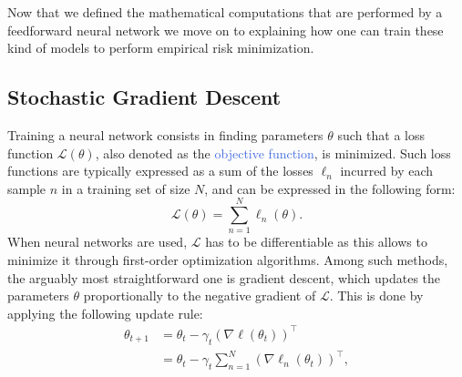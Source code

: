 Now that we defined the mathematical computations that are performed by a feedforward neural network we move on to explaining how one can train these kind of models to perform empirical risk minimization.

\subsection{Stochastic Gradient Descent}
\label{sec:sgd}

Training a neural network consists in finding parameters $\theta$ such that a loss function $\mathscr{L}(\theta)$, also denoted as the \textcolor{RoyalBlue}{objective function}, is minimized. Such loss functions are typically expressed as a sum of the losses $\ell_n$ incurred by each sample $n$ in a training set of size $N$, and can be expressed in the following form:
\begin{equation}
	\mathscr{L}(\theta) = \sum_{n=1}^{N}\ell_n(\theta).
	\label{eq:sum_of_losses}
\end{equation}
When neural networks are used, $\mathscr{L}$ has to be differentiable as this allows to minimize it through first-order optimization algorithms. Among such methods, the arguably most straightforward one is gradient descent, which updates the parameters $\theta$ proportionally to the negative gradient of $\mathscr{L}$. This is done by applying the following update rule:
\begin{equation}
	\begin{split}
	\theta_{t+1} & = \theta_t - \gamma_t(\nabla\ell(\theta_t))^{\intercal} \\ 
	& = \theta_t - \gamma_t \sum_{n=1}^{N}(\nabla \ell_n(\theta_t))^{\intercal},
	\end{split}
	\label{eq:gradient_descent_1}
\end{equation}
